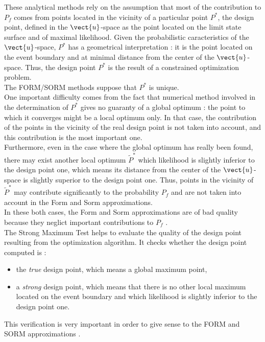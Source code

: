 {  These analytical methods rely on the assumption that most of the contribution to $P_f$ comes from points located in the vicinity of a particular point $P^*$, the design point, defined in the $\vect{u}$-space as the point located on the limit state surface and of maximal likelihood. Given the probabilistic caracteristics of the $\vect{u}$-space, $P^*$ has a geometrical interpretation : it is the point located on the event boundary and at minimal distance from the center of the $\vect{u}$-space. Thus, the design point $P^*$ is the result of a constrained optimization problem.\\

  The FORM/SORM methods suppose that $P^*$ is unique.\\

  One important difficulty comes from the fact that numerical method involved in the determination of $P^*$ gives no guaranty of a global optimum : the point to which it converges might be a local optimum only. In that case, the contribution of the points in the vicinity of the real design point is not taken into account, and this contribution is the most important one.\\
  Furthermore, even in the case where the global optimum has really been found, there may exist another local optimum $\tilde{P}^*$ which likelihood is slightly inferior to the design point one, which means its distance from the center of the $\vect{u}$-space  is slightly superior to the design point one. Thus, points in the vicinity of $\tilde{P}^*$ may contribute significantly to the probability $P_f$ and are not taken into account in the Form and Sorm approximations. \\
  In these both cases, the Form and Sorm approximations are of bad quality because they neglict  important contributions to $P_f$ .\\

  The Strong Maximum Test helps to evaluate the quality of the design point resulting from the optimization algorithm. It checks whether the design point computed is :
  \begin{itemize}
  \item the {\em true} design point, which means a global maximum point,
  \item a {\em strong} design point, which means that there is no other local maximum located on the event boundary and which likelihood is slightly inferior to the design point one.
  \end{itemize}
  This verification is very important in order to give sense to the FORM and SORM approximations .\\

}

